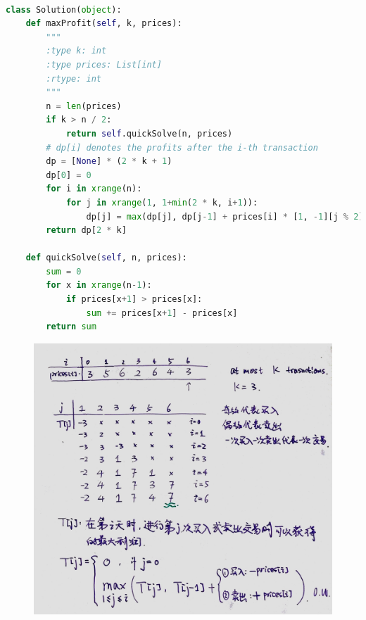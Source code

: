 \documentclass[a4paper,10pt]{article}
\begin{document}
\begin{lstlisting}[language=Python, caption=Problem188. Best Time to Buy and Sell Stock IV]

class Solution(object):
    def maxProfit(self, k, prices):
        """
        :type k: int
        :type prices: List[int]
        :rtype: int
        """
        n = len(prices)
        if k > n / 2:
            return self.quickSolve(n, prices)
        # dp[i] denotes the profits after the i-th transaction
        dp = [None] * (2 * k + 1)
        dp[0] = 0
        for i in xrange(n):
            for j in xrange(1, 1+min(2 * k, i+1)):
                dp[j] = max(dp[j], dp[j-1] + prices[i] * [1, -1][j % 2])
        return dp[2 * k]

    def quickSolve(self, n, prices):
        sum = 0
        for x in xrange(n-1):
            if prices[x+1] > prices[x]:
                sum += prices[x+1] - prices[x]
        return sum
\end{lstlisting}

\begin{figure}[h]
\includegraphics[width=\textwidth]{leetcode188.jpg}
\centering\\
\end{figure}














%
\end{document}

